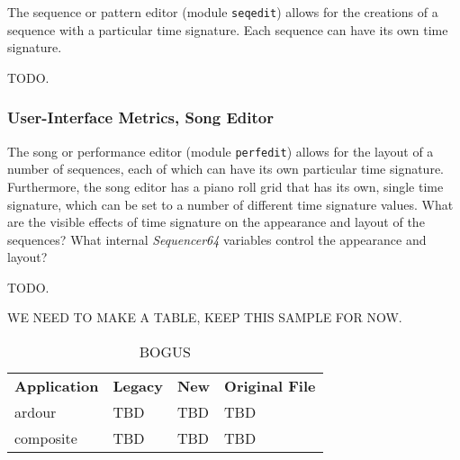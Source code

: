    The sequence or pattern editor (module \texttt{seqedit}) allows for the
   creations of a sequence with a particular time signature.  Each sequence can
   have its own time signature.

   TODO.

\subsubsection{User-Interface Metrics, Song Editor}
\label{subsubsec:metrics_issues_ui_perfedit}

   The song or performance editor (module \texttt{perfedit}) allows for the
   layout of a number of sequences, each of which can have its own
   particular time signature.
   Furthermore, the song editor has a piano roll grid that has its own, single
   time signature, which can be set to a number of different time signature
   values.  What are the visible effects of time signature on the appearance
   and layout of the sequences?  What internal \textsl{Sequencer64}
   variables control the appearance and layout?

   TODO.

   WE NEED TO MAKE A TABLE, KEEP THIS SAMPLE FOR NOW.

   \begin{table}
      \centering
      \caption{BOGUS}
      \label{table:BOGUS}
      \begin{tabular}{l l l l}
         \textbf{Application}  &
            \textbf{Legacy} &
            \textbf{New} & 
            \textbf{Original File} \\
         ardour       & TBD       & TBD       & TBD \\
         composite    & TBD       & TBD       & TBD \\
      \end{tabular}
   \end{table}

